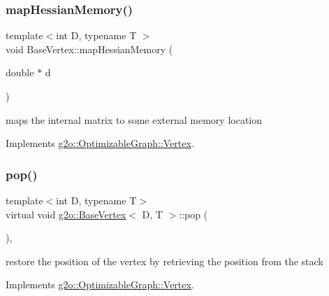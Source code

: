 \mbox{\label{classg2o_1_1_base_vertex_a54227ac315e6bc75c63ed117a2c75668}} 
\subsubsection{\texorpdfstring{map\+Hessian\+Memory()}{mapHessianMemory()}}
{\footnotesize\ttfamily template$<$int D, typename T $>$ \\
void Base\+Vertex\+::map\+Hessian\+Memory (\begin{DoxyParamCaption}\item[{double $\ast$}]{d }\end{DoxyParamCaption})\hspace{0.3cm}{\ttfamily [virtual]}}

maps the internal matrix to some external memory location 

Implements \mbox{\hyperlink{classg2o_1_1_optimizable_graph_1_1_vertex_a1008c0f7981a9fb11be3e3df5c4a9758}{g2o\+::\+Optimizable\+Graph\+::\+Vertex}}.

\mbox{\label{classg2o_1_1_base_vertex_a502bf3db2ee32061a2c8257ef81a1552}} 
\subsubsection{\texorpdfstring{pop()}{pop()}}
{\footnotesize\ttfamily template$<$int D, typename T$>$ \\
virtual void \mbox{\hyperlink{classg2o_1_1_base_vertex}{g2o\+::\+Base\+Vertex}}$<$ D, T $>$\+::pop (\begin{DoxyParamCaption}{ }\end{DoxyParamCaption})\hspace{0.3cm}{\ttfamily [inline]}, {\ttfamily [virtual]}}



restore the position of the vertex by retrieving the position from the stack 



Implements \mbox{\hyperlink{classg2o_1_1_optimizable_graph_1_1_vertex_a3e36d925dbda1c574a285826ade5909a}{g2o\+::\+Optimizable\+Graph\+::\+Vertex}}.

